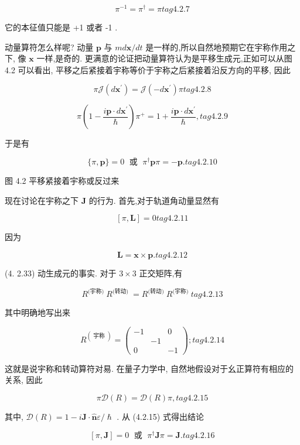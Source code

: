 $$
{\pi }^{-1} = {\pi }^{ \dagger } = \pi tag{4.2.7}
$$

它的本征值只能是 +1 或者 -1 .

动量算符怎么样呢? 动量 $\mathbf{p}$ 与 ${md}\mathbf{x}/{dt}$ 是一样的,所以自然地预期它在宇称作用之下, 像 $\mathbf{x}$ 一样,是奇的. 更满意的论证把动量算符认为是平移生成元,正如可以从图 4.2 可以看出, 平移之后紧接着宇称等价于宇称之后紧接着沿反方向的平移, 因此

$$
\pi \mathcal{J}\left( {d{\mathbf{x}}^{\prime }}\right) = \mathcal{J}\left( {-d{\mathbf{x}}^{\prime }}\right) \pi tag{4.2.8}
$$

$$
\pi \left( {1 - \frac{i\mathbf{p} \cdot d{\mathbf{x}}^{\prime }}{\hslash }}\right) {\pi }^{ + } = 1 + \frac{i\mathbf{p} \cdot d{\mathbf{x}}^{\prime }}{\hslash }, tag{4.2.9}
$$

于是有

$$
\{ \pi ,\mathbf{p}\} = 0\;\text{ 或 }\;{\pi }^{ \dagger }\mathbf{p}\pi = - \mathbf{p}. tag{4.2.10}
$$



图 4.2 平移紧接着宇称或反过来

现在讨论在宇称之下 $\mathbf{J}$ 的行为. 首先,对于轨道角动量显然有

$$
\left\lbrack {\pi ,\mathbf{L}}\right\rbrack = 0 tag{4.2.11}
$$

因为

$$
\mathbf{L} = \mathbf{x} \times \mathbf{p}. tag{4.2.12}
$$

(4. 2.33) 动生成元的事实. 对于 $3 \times 3$ 正交矩阵,有

$$
{R}^{\text{(宇称) }}{R}^{\text{(转动) }} = {R}^{\text{(转动) }}{R}^{\text{(宇称) }} tag{4.2.13}
$$

其中明确地写出来

$$
{R}^{\left( \text{ 宇称 }\right) } = \left( \begin{matrix} - 1 & & 0 \\ & - 1 & \\ 0 & & - 1 \end{matrix}\right) ; tag{4.2.14}
$$

这就是说宇称和转动算符对易. 在量子力学中, 自然地假设对于幺正算符有相应的关系, 因此

$$
\pi \mathcal{D}\left( R\right) = \mathcal{D}\left( R\right) \pi , tag{4.2.15}
$$

其中, $\mathcal{D}\left( R\right) = 1 - i\mathbf{J} \cdot \widehat{\mathbf{n}}\varepsilon /\hslash$ . 从 (4.2.15) 式得出结论

$$
\left\lbrack {\pi ,\mathbf{J}}\right\rbrack = 0\;\text{ 或 }\;{\pi }^{ \dagger }\mathbf{J}\pi = \mathbf{J}. tag{4.2.16}
$$

